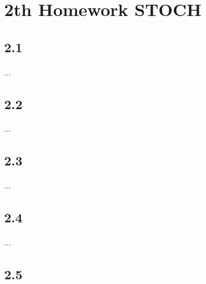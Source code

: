
\section{2th Homework STOCH}
\subsection{2.1}


\begin{solution}
	...
\end{solution}

\subsection{2.2}

\begin{solution}
	...
\end{solution}

\subsection{2.3}

\begin{solution}
	...
\end{solution}

\subsection{2.4}

\begin{solution}
	...
\end{solution}


\subsection{2.5}

